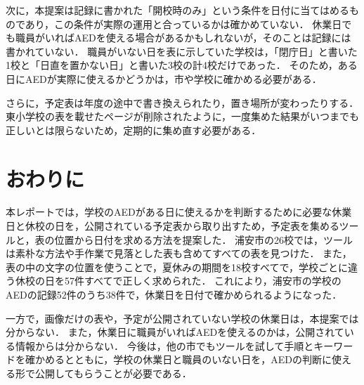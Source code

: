 \documentclass[a4paper,12pt,oneside]{jex}
\begin{document}
次に，本提案は記録に書かれた「開校時のみ」という条件を日付に当てはめるものであり，この条件が実際の運用と合っているかは確かめていない．
休業日でも職員がいればAEDを使える場合があるかもしれないが，そのことは記録には書かれていない．
職員がいない日を表に示していた学校は，「閉庁日」と書いた1校と「日直を置かない日」と書いた3校の計4校だけであった．
そのため，ある日にAEDが実際に使えるかどうかは，市や学校に確かめる必要がある．

さらに，予定表は年度の途中で書き換えられたり，置き場所が変わったりする．
東小学校の表を載せたページが削除されたように，一度集めた結果がいつまでも正しいとは限らないため，定期的に集め直す必要がある．

\section{おわりに}
\label{sec:conclusion}

本レポートでは，学校のAEDがある日に使えるかを判断するために必要な休業日と休校の日を，公開されている予定表から取り出すため，予定表を集めるツールと，表の位置から日付を求める方法を提案した．
浦安市の26校では，ツールは素朴な方法や手作業で見落とした表も含めてすべての表を見つけた．
また，表の中の文字の位置を使うことで，夏休みの期間を18校すべてで，学校ごとに違う休校の日を57件すべてで正しく求められた．
これにより，浦安市の学校のAEDの記録52件のうち38件で，休業日を日付で確かめられるようになった．

一方で，画像だけの表や，予定が公開されていない学校の休業日は，本提案では分からない．
また，休業日に職員がいればAEDを使えるのかは，公開されている情報からは分からない．
今後は，他の市でもツールを試して手順とキーワードを確かめるとともに，学校の休業日と職員のいない日を，AEDの判断に使える形で公開してもらうことが必要である．
\end{document}
